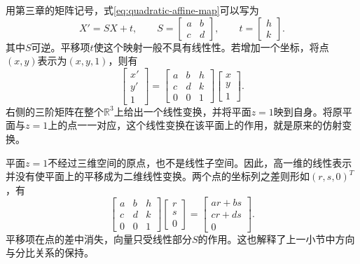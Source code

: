 用第三章的矩阵记号，式\eqref{eq:quadratic-affine-map}可以写为
\begin{equation*}
    X'=SX+t , \qquad
    S=\left[\begin{matrix}a&b\\c&d\end{matrix}\right] , \qquad
    t=\left[\begin{matrix}h\\k\end{matrix}\right] .
\end{equation*}
其中\(S\)可逆。平移项\(t\)使这个映射一般不具有线性性。若增加一个坐标，将点\((x,y)\)表示为\((x,y,1)\)，则有
\begin{equation}\label{eq:quadratic-affine-lift}
    \left[\begin{matrix}x'\\y'\\1\end{matrix}\right]
    =\left[\begin{matrix}a&b&h\\c&d&k\\0&0&1\end{matrix}\right]
     \left[\begin{matrix}x\\y\\1\end{matrix}\right] .
\end{equation}
右侧的三阶矩阵在整个\(\mathbb R^3\)上给出一个线性变换，并将平面\(z=1\)映到自身。将原平面与\(z=1\)上的点一一对应，这个线性变换在该平面上的作用，就是原来的仿射变换。

平面\(z=1\)不经过三维空间的原点，也不是线性子空间。因此，高一维的线性表示并没有使平面上的平移成为二维线性变换。两个点的坐标列之差则形如\((r,s,0)^T\)，有
\begin{equation*}
    \left[\begin{matrix}a&b&h\\c&d&k\\0&0&1\end{matrix}\right]
    \left[\begin{matrix}r\\s\\0\end{matrix}\right]
    =\left[\begin{matrix}ar+bs\\cr+ds\\0\end{matrix}\right] .
\end{equation*}
平移项在点的差中消失，向量只受线性部分\(S\)的作用。这也解释了上一小节中方向与分比关系的保持。

